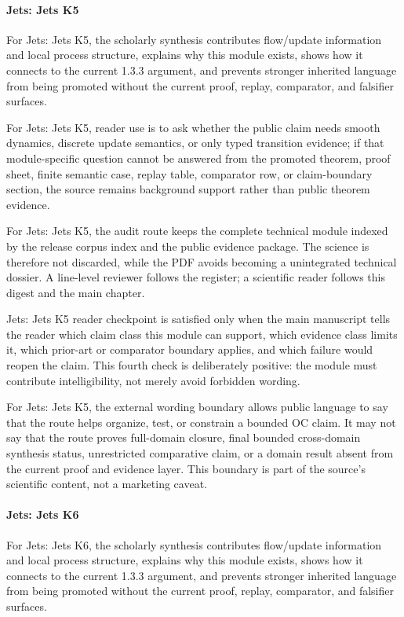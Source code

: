 \paragraph{Jets: Jets K5}

For Jets: Jets K5, the scholarly synthesis contributes flow/update information and local process structure, explains why this module exists, shows how it connects to the current 1.3.3 argument, and prevents stronger inherited language from being promoted without the current proof, replay, comparator, and falsifier surfaces.


For Jets: Jets K5, reader use is to ask whether the public claim needs smooth dynamics, discrete update semantics, or only typed transition evidence; if that module-specific question cannot be answered from the promoted theorem, proof sheet, finite semantic case, replay table, comparator row, or claim-boundary section, the source remains background support rather than public theorem evidence.


For Jets: Jets K5, the audit route keeps the complete technical module indexed by the release corpus index and the public evidence package. The science is therefore not discarded, while the PDF avoids becoming a unintegrated technical dossier. A line-level reviewer follows the register; a scientific reader follows this digest and the main chapter.


Jets: Jets K5 reader checkpoint is satisfied only when the main manuscript tells the reader which claim class this module can support, which evidence class limits it, which prior-art or comparator boundary applies, and which failure would reopen the claim. This fourth check is deliberately positive: the module must contribute intelligibility, not merely avoid forbidden wording.


For Jets: Jets K5, the external wording boundary allows public language to say that the route helps organize, test, or constrain a bounded OC claim. It may not say that the route proves full-domain closure, final bounded cross-domain synthesis status, unrestricted comparative claim, or a domain result absent from the current proof and evidence layer. This boundary is part of the source's scientific content, not a marketing caveat.


\paragraph{Jets: Jets K6}

For Jets: Jets K6, the scholarly synthesis contributes flow/update information and local process structure, explains why this module exists, shows how it connects to the current 1.3.3 argument, and prevents stronger inherited language from being promoted without the current proof, replay, comparator, and falsifier surfaces.


